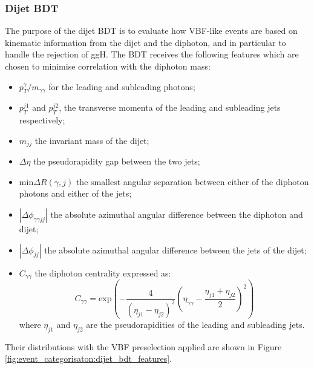 \subsubsection{Dijet BDT}
The purpose of the dijet BDT is to evaluate how VBF-like events are based on kinematic information from the dijet and the diphoton, and in particular to handle the rejection of ggH.
The BDT receives the following features which are chosen to minimise correlation with the diphoton mass:
\begin{itemize}[noitemsep]
    \item $p^{\gamma}_{T}/m_{\gamma\gamma}$ for the leading and subleading photons;
    \item $p_{T}^{j1}$ and $p_{T}^{j2}$, the transverse momenta of the leading and subleading jets respectively;
    \item $m_{jj}$ the invariant mass of the dijet;
    \item $\Delta\eta$ the pseudorapidity gap between the two jets;
    \item $\mathrm{min}\Delta{R}(\gamma,j)$ the smallest angular separation between either of the diphoton photons and either of the jets;
    \item $|\Delta\phi_{\gamma\gamma{jj}}|$ the absolute azimuthal angular difference between the diphoton and dijet;
    \item $|\Delta\phi_{jj}|$ the absolute azimuthal angular difference between the jets of the dijet;
    \item $C_{\gamma\gamma}$ the diphoton centrality expressed as:
        \begin{equation}
            C_{\gamma\gamma} = \mathrm{exp}\left(-\frac{4}{(\eta_{j1} - \eta_{j2})^{2}}\left( \eta_{\gamma\gamma} - \frac{\eta_{j1} + \eta_{j2}}{2} \right)^{2}\right)
        \end{equation}
        where $\eta_{j1}$ and $\eta_{j2}$ are the pseudorapidities of the leading and subleading jets.
\end{itemize}
Their distributions with the VBF preselection applied are shown in Figure \ref{fig:event_categorisaton:dijet_bdt_features}.


